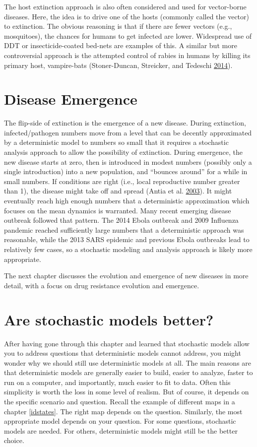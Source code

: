 \documentclass[]{book}
\theoremstyle{definition}
\theoremstyle{definition}
\theoremstyle{definition}
\theoremstyle{remark}
\begin{document}
The host extinction approach is also often considered and used for
vector-borne diseases. Here, the idea is to drive one of the hosts
(commonly called the vector) to extinction. The obvious reasoning is
that if there are fewer vectors (e.g., mosquitoes), the chances for
humans to get infected are lower. Widespread use of DDT or
insecticide-coated bed-nets are examples of this. A similar but more
controversial approach is the attempted control of rabies in humans by
killing its primary host, vampire-bats (Stoner-Duncan, Streicker, and
Tedeschi \protect\hyperlink{ref-stoner-duncan14}{2014}).

\section{Disease Emergence}\label{disease-emergence}

The flip-side of extinction is the emergence of a new disease. During
extinction, infected/pathogen numbers move from a level that can be
decently approximated by a deterministic model to numbers so small that
it requires a stochastic analysis approach to allow the possibility of
extinction. During emergence, the new disease starts at zero, then is
introduced in modest numbers (possibly only a single introduction) into
a new population, and ``bounces around'' for a while in small numbers.
If conditions are right (i.e., local reproductive number greater than
1), the disease might take off and spread (Antia et al.
\protect\hyperlink{ref-antia03}{2003}). It might eventually reach high
enough numbers that a deterministic approximation which focuses on the
mean dynamics is warranted. Many recent emerging disease outbreak
followed that pattern. The 2014 Ebola outbreak and 2009 Influenza
pandemic reached sufficiently large numbers that a deterministic
approach was reasonable, while the 2013 SARS epidemic and previous Ebola
outbreaks lead to relatively few cases, so a stochastic modeling and
analysis approach is likely more appropriate.

The next chapter discusses the evolution and emergence of new diseases
in more detail, with a focus on drug resistance evolution and emergence.

\section{Are stochastic models
better?}\label{are-stochastic-models-better}

After having gone through this chapter and learned that stochastic
models allow you to address questions that deterministic models cannot
address, you might wonder why we should still use deterministic models
at all. The main reasons are that deterministic models are generally
easier to build, easier to analyze, faster to run on a computer, and
importantly, much easier to fit to data. Often this simplicity is worth
the loss in some level of realism. But of course, it depends on the
specific scenario and question. Recall the example of different maps in
a chapter \ref{idstates}. The right map depends on the question.
Similarly, the most appropriate model depends on your question. For some
questions, stochastic models are needed. For others, deterministic
models might still be the better choice.
\end{document}
